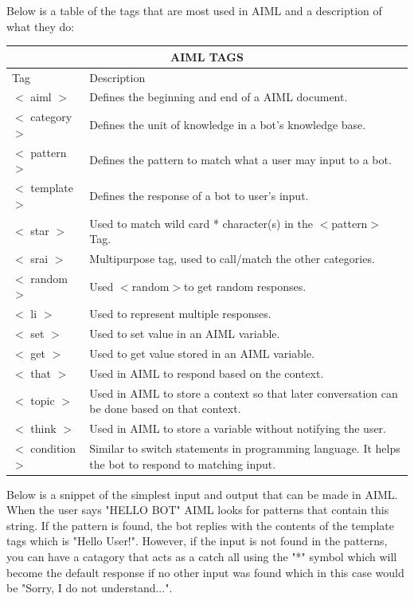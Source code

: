 Below is a table of the tags that are most used in AIML and a description of what they do:
\newline
\begin{tabular}{ |p{3cm}|p{10cm}|  }
\hline
\multicolumn{2}{|c|}{AIML TAGS} \\
\hline
Tag & Description \\
\hline
$<$ aiml $>$ & Defines the beginning and end of a AIML document. \\
\hline
$<$ category $>$ & Defines the unit of knowledge in a bot's knowledge base. \\
\hline
$<$ pattern $>$ & Defines the pattern to match what a user may input to a bot. \\
\hline
$<$ template $>$ & Defines the response of a bot to user's input. \\
\hline
$<$ star $>$ & Used to match wild card * character(s) in the $<$pattern$>$ Tag. \\
\hline
$<$ srai $>$ & Multipurpose tag, used to call/match the other categories. \\
\hline
$<$ random $>$ & Used $<$random$>$to get random responses. \\
\hline
$<$ li $>$ & Used to represent multiple responses. \\
\hline
$<$ set $>$ & Used to set value in an AIML variable. \\
\hline
$<$ get $>$ & Used to get value stored in an AIML variable. \\
\hline
$<$ that $>$ & Used in AIML to respond based on the context. \\
\hline
$<$ topic $>$ & Used in AIML to store a context so that later conversation can be done based on
that context. \\
\hline
$<$ think $>$ & Used in AIML to store a variable without notifying the user. \\
\hline
$<$ condition $>$ & Similar to switch statements in programming language. It helps the bot to respond
to matching input.\\
\hline
\end{tabular}
\newline
\newline

Below is a snippet of the simplest input and output that can be made in AIML. When the user says "HELLO BOT" AIML looks for patterns that contain this string. If the pattern is found, the bot replies with the contents of the template tags which is "Hello User!". However, if the input is not found in the patterns, you can have a catagory that acts as a catch all using the "*" symbol which will become the default response if no other input was found which in this case would be "Sorry, I do not understand...".

